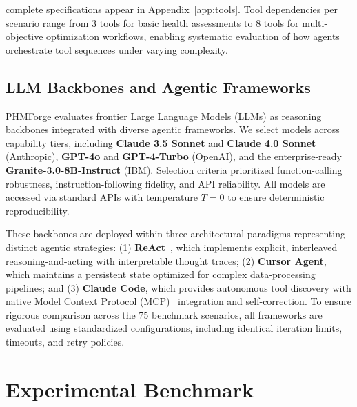 \documentclass[sigconf, screen, nonacm]{acmart}
\begin{document}

  complete specifications appear in Appendix~\ref{app:tools}. Tool dependencies per        
  scenario       
  range from 3 tools for basic health assessments to 8 tools for multi-objective
  optimization              
  workflows, enabling systematic evaluation of how agents orchestrate tool sequences under 
  varying complexity.                            

\subsection{LLM Backbones and Agentic Frameworks}
PHMForge evaluates frontier Large Language Models (LLMs) as reasoning backbones integrated with diverse agentic frameworks. We select models across capability tiers, including \textbf{Claude 3.5 Sonnet} and \textbf{Claude 4.0 Sonnet} (Anthropic), \textbf{GPT-4o} and \textbf{GPT-4-Turbo} (OpenAI), and the enterprise-ready \textbf{Granite-3.0-8B-Instruct} (IBM). Selection criteria prioritized function-calling robustness, instruction-following fidelity, and API reliability. All models are accessed via standard APIs with temperature $T=0$ to ensure deterministic reproducibility.

These backbones are deployed within three architectural paradigms representing distinct agentic strategies:
(1) \textbf{ReAct}~\cite{yao2023reactsynergizingreasoningacting}, which implements explicit, interleaved reasoning-and-acting with interpretable thought traces; 
(2) \textbf{Cursor Agent}, which maintains a persistent state optimized for complex data-processing pipelines; and 
(3) \textbf{Claude Code}, which provides autonomous tool discovery with native Model Context Protocol (MCP)~\cite{cursor_docs} integration and self-correction. 
To ensure rigorous comparison across the 75 benchmark scenarios, all frameworks are evaluated using standardized configurations, including identical iteration limits, timeouts, and retry policies.

\section{Experimental Benchmark}
\end{document}
